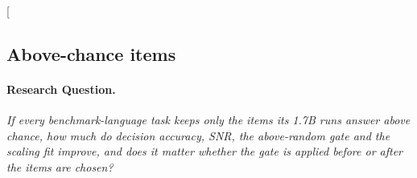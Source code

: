 \clearpage
\twocolumn[{%
\rqparent
\subsection{Above-chance items}
\label{app:rq12_above_chance_items}

\noindent\begin{minipage}[t]{0.485\textwidth}
\vspace{0pt}
\paragraph{Research Question.} \emph{If every benchmark-language task keeps only the items its 1.7B runs answer above chance, how much do decision accuracy, SNR, the above-random gate and the scaling fit improve, and does it matter whether the gate is applied before or after the items are chosen?}


\end{minipage}}
